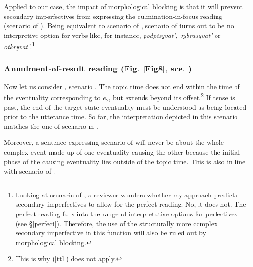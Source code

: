 \documentclass[output=paper,colorlinks,citecolor=brown]{langscibook}
\begin{document}
Applied to our case, the impact of morphological blocking is that it will prevent secondary imperfectives 
from expressing the culmination-in-focus reading (scenario  of ). Being equivalent to scenario  of , scenario  of  turns out to be no interpretive option
for verbs like, for instance, \textit{podpisyvat'}, \textit{vybrasyvat'} or \textit{otkryvat'}.\footnote{Looking at scenario  of , a reviewer wonders whether my approach predicts secondary imperfectives to allow for the perfect reading. No, it does not. The perfect reading falls into the range of interpretative options for perfectives (see \S \ref{perfect}). Therefore, the use of the structurally more complex secondary imperfective in this function will also be ruled out by morphological blocking.}

\subsubsection{Annulment-of-result reading (Fig. \ref{Fig8}, sce. )}
Now let us consider , scenario . The topic time does not end within the time of the eventuality corresponding to $e_2$, but extends beyond its offset.\footnote{This is why (\ref{ttl}) does not apply.} If tense is past, the end of the target state eventuality must be understood as being located prior to the utterance time. So far, the interpretation depicted in this scenario matches the one of scenario  in .

Moreover, a sentence expressing scenario  of  will never be about the whole complex event made up of one eventuality causing the other because the initial phase of the causing eventuality lies outside of the topic time. This is also in line with scenario  of .
\end{document}

